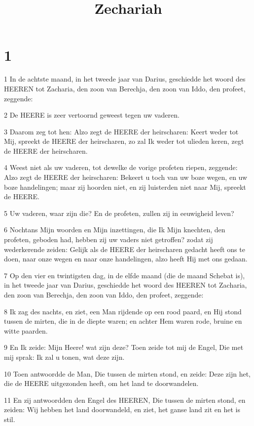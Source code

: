 

\title{Zechariah}



\chapter{1}

\par 1 In de achtste maand, in het tweede jaar van Darius, geschiedde het woord des HEEREN tot Zacharia, den zoon van Berechja, den zoon van Iddo, den profeet, zeggende:
\par 2 De HEERE is zeer vertoornd geweest tegen uw vaderen.
\par 3 Daarom zeg tot hen: Alzo zegt de HEERE der heirscharen: Keert weder tot Mij, spreekt de HEERE der heirscharen, zo zal Ik weder tot ulieden keren, zegt de HEERE der heirscharen.
\par 4 Weest niet als uw vaderen, tot dewelke de vorige profeten riepen, zeggende: Alzo zegt de HEERE der heirscharen: Bekeert u toch van uw boze wegen, en uw boze handelingen; maar zij hoorden niet, en zij luisterden niet naar Mij, spreekt de HEERE.
\par 5 Uw vaderen, waar zijn die? En de profeten, zullen zij in eeuwigheid leven?
\par 6 Nochtans Mijn woorden en Mijn inzettingen, die Ik Mijn knechten, den profeten, geboden had, hebben zij uw vaders niet getroffen? zodat zij wederkerende zeiden: Gelijk als de HEERE der heirscharen gedacht heeft ons te doen, naar onze wegen en naar onze handelingen, alzo heeft Hij met ons gedaan.
\par 7 Op den vier en twintigsten dag, in de elfde maand (die de maand Schebat is), in het tweede jaar van Darius, geschiedde het woord des HEEREN tot Zacharia, den zoon van Berechja, den zoon van Iddo, den profeet, zeggende:
\par 8 Ik zag des nachts, en ziet, een Man rijdende op een rood paard, en Hij stond tussen de mirten, die in de diepte waren; en achter Hem waren rode, bruine en witte paarden.
\par 9 En Ik zeide: Mijn Heere! wat zijn deze? Toen zeide tot mij de Engel, Die met mij sprak: Ik zal u tonen, wat deze zijn.
\par 10 Toen antwoordde de Man, Die tussen de mirten stond, en zeide: Deze zijn het, die de HEERE uitgezonden heeft, om het land te doorwandelen.
\par 11 En zij antwoordden den Engel des HEEREN, Die tussen de mirten stond, en zeiden: Wij hebben het land doorwandeld, en ziet, het ganse land zit en het is stil.
